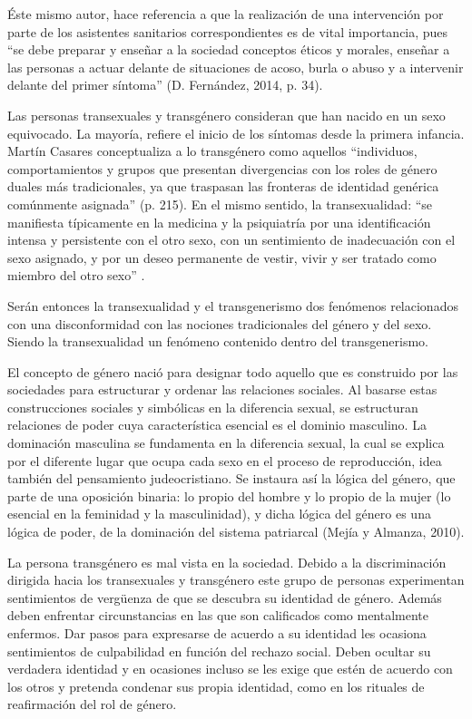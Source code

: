 Éste mismo autor, hace referencia a que la realización de una intervención por
parte de los asistentes sanitarios correspondientes es de vital importancia,
pues “se debe preparar y enseñar a la sociedad conceptos éticos y morales,
enseñar a las personas a actuar delante de situaciones de acoso, burla o abuso y
a intervenir delante del primer síntoma” (D. Fernández, 2014, p. 34).

Las personas transexuales y transgénero consideran que han nacido en un sexo
equivocado. La mayoría, refiere el inicio de los síntomas desde la primera
infancia. Martín Casares \parencite[c.p]{BergeroMiguel2008} conceptualiza a lo
transgénero como aquellos “individuos, comportamientos y grupos que presentan
divergencias con los roles de género duales más tradicionales, ya que traspasan
las fronteras de identidad genérica comúnmente asignada” (p. 215). En el mismo
sentido, la transexualidad: “se manifiesta típicamente en la medicina y la
psiquiatría por una identificación intensa y persistente con el otro sexo, con
un sentimiento de inadecuación con el sexo asignado, y por un deseo permanente
de vestir, vivir y ser tratado como miembro del otro sexo” \parencite[][p. 91]{GomezGil2006}.

Serán entonces la transexualidad y el transgenerismo dos fenómenos relacionados
con una disconformidad con las nociones tradicionales del género y del sexo.
Siendo la transexualidad un fenómeno contenido dentro del transgenerismo.

El concepto de género nació para designar todo aquello que es construido por las
sociedades para estructurar y ordenar las relaciones sociales. Al basarse estas
construcciones sociales y simbólicas en la diferencia sexual, se estructuran
relaciones de poder cuya característica esencial es el dominio masculino. La
dominación masculina se fundamenta en la diferencia sexual, la cual se explica
por el diferente lugar que ocupa cada sexo en el proceso de reproducción, idea
también del pensamiento judeocristiano. Se instaura así la lógica del género,
que parte de una oposición binaria: lo propio del hombre y lo propio de la mujer
(lo esencial en la feminidad y la masculinidad), y dicha lógica del género es
una lógica de poder, de la dominación del sistema patriarcal (Mejía y Almanza,
2010).

La persona transgénero es mal vista en la sociedad. Debido a la discriminación
dirigida hacia los transexuales y transgénero este grupo de personas
experimentan sentimientos de vergüenza de que se descubra su identidad de
género. Además deben enfrentar circunstancias en las que son calificados como
mentalmente enfermos. Dar pasos para expresarse de acuerdo a su identidad les
ocasiona sentimientos de culpabilidad en función del rechazo social. Deben
ocultar su verdadera identidad y en ocasiones incluso se les exige que estén de
acuerdo con los otros y pretenda condenar sus propia identidad,
como en los rituales de reafirmación del rol de género.

